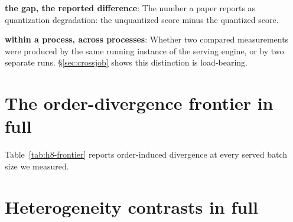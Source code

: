 \documentclass[conference]{IEEEtran}
\begin{document}
\smallskip
\noindent\textbf{the gap, the reported difference}: The number a paper reports as quantization degradation: the unquantized score minus the quantized score.\par
\smallskip
\noindent\textbf{within a process, across processes}: Whether two compared measurements were produced by the same running instance of the serving engine, or by two separate runs. \S\ref{sec:crossjob} shows this distinction is load-bearing.\par


\section{The order-divergence frontier in full}
\label{app:h8frontier}


Table~\ref{tab:h8-frontier} reports order-induced divergence at every served batch
size we measured.

\begin{table}[t]
\centering
\caption{Order-induced divergence at three measurement levels (generated
text, and correctness under strict and permissive extraction) by served
batch size $B$, on \hEightItems{} items with \hEightOrderings{} orderings. This
bounds what a third party can reproduce at each configuration, which is why we
report the whole frontier rather than only the value we adopt.}
\label{tab:h8-frontier}
\small

\end{table}

\section{Heterogeneity contrasts in full}
\label{app:h3het}

\end{document}
